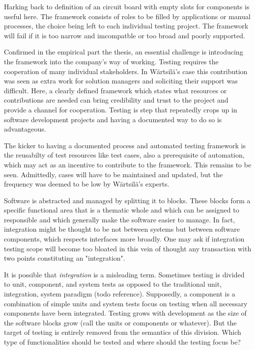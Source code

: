 \documentclass[12pt,a4paper,oneside,pdftex]{report}
\begin{document}
{%
Harking back to \citep{pezze2008software} definition of an circuit board with empty slots for components is useful here. The framework consists of roles to be filled by applications or manual processes, the choice being left to each individual testing project. The framework will fail if it is too narrow and imcompatble or too broad and poorly supported.

Confirmed in the empirical part the thesis, an essential challenge is introducing the framework into the company's way of working. Testing requires the cooperation of many individual stakeholders. In Wärtsilä's case this contribution was seen as extra work for solution managers and soliciting their support was difficult. Here, a clearly defined framework which states what resources or contributions are needed can bring credibility and trust to the project and provide a channel for cooperation. Testing is step that repeatedly crops up in software development projects and having a documented way to do so is advantageous.

The kicker to having a documented process and automated testing framework is the reusabilty of test resources like test cases, also a prerequisite of automation, which may act as an incentive to contribute to the framework. This remains to be seen. Admittedly, cases will have to be maintained and updated, but the frequency was deemed to be low by Wärtsilä's experts.

Software is abstracted and managed by splitting it to blocks. These blocks form a specific functional area that is a thematic whole and which can be assigned to responsible and which generally make the software easier to manage. In fact, integration might be thought to be not between systems but between software components, which respects interfaces more broadly. One may ask if integration testing scope will become too bloated in this vein of thought any transaction with two points constituting an "integration".

It is possible that \emph{integration} is a misleading term. Sometimes testing is divided to unit, component, and system tests as opposed to the traditional unit, integration, system paradigm (todo reference). Supposedly, a component is a combination of simple units and system tests focus on testing when all necessary components have been integrated. Testing grows with development as the size of the software blocks grow (call the units or components or whatever). But the target of testing is entirely removed from the semantics of this division. Which type of functionalities should be tested and where should the testing focus be?

}
\end{document}

